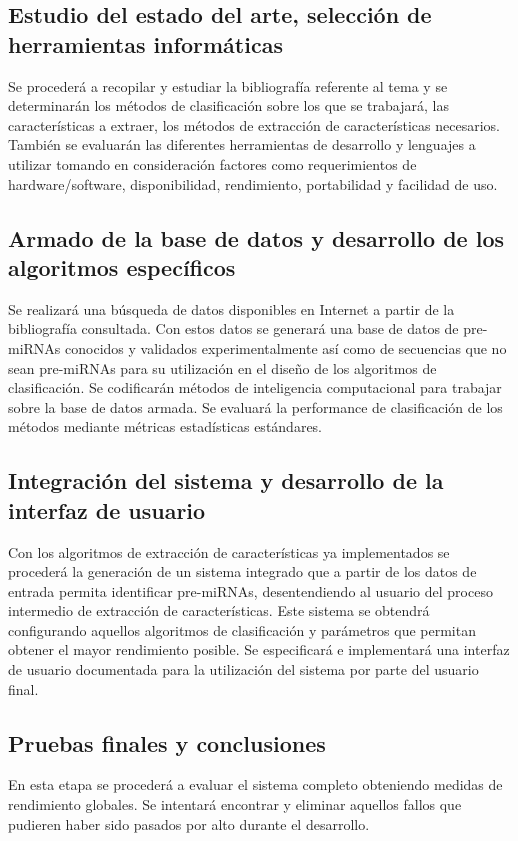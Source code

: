 \documentclass[bibliography=openstyle,DIV=12]{scrartcl}
\begin{document}
\subsection{Estudio del estado del arte, selección de herramientas informáticas}
Se procederá a recopilar y estudiar la bibliografía referente al tema y se determinarán los métodos de clasificación sobre los que se trabajará, las características a extraer, los métodos de extracción de características necesarios. También se evaluarán las diferentes herramientas de desarrollo y lenguajes a utilizar tomando en consideración factores como requerimientos de hardware/software, disponibilidad, rendimiento, portabilidad y facilidad de uso.
\subsection{Armado de la base de datos y desarrollo de los algoritmos específicos}
Se realizará una búsqueda de datos disponibles en Internet a partir de la bibliografía consultada. Con estos datos se generará una base de datos de pre-miRNAs conocidos y validados experimentalmente así como de secuencias que no sean pre-miRNAs para su utilización en el diseño de los algoritmos de clasificación.
Se codificarán métodos de inteligencia computacional para trabajar sobre la base de datos armada. Se evaluará la performance de clasificación de los métodos mediante métricas estadísticas estándares.
\subsection{Integración del sistema y desarrollo de la interfaz de usuario}
Con los algoritmos de extracción de características ya implementados se procederá la generación de un sistema integrado que a partir de los datos de entrada permita identificar pre-miRNAs, desentendiendo al usuario del proceso intermedio de extracción de características. Este sistema se obtendrá configurando aquellos algoritmos de clasificación y parámetros que permitan obtener el mayor rendimiento posible.
Se especificará e implementará una interfaz de usuario documentada para la utilización del sistema por parte del usuario final.
\subsection{Pruebas finales y conclusiones}
En esta etapa se procederá a evaluar el sistema completo obteniendo medidas de rendimiento globales. Se intentará encontrar y eliminar aquellos fallos que pudieren haber sido pasados por alto durante el desarrollo.
\end{document}
